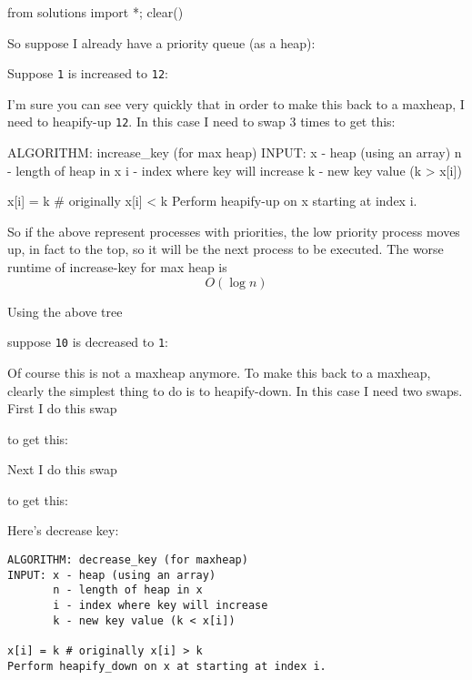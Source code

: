 \begin{python0}
from solutions import *; clear()
\end{python0}

So suppose I already have a priority queue (as a heap):




Suppose \texttt{1} is increased to \texttt{12}:




I'm sure you can see very quickly that in order to make this back to
a maxheap, I need to heapify-up \texttt{12}.
In this case I need to swap 3 times to get this:



\begin{console}
ALGORITHM: increase_key (for max heap)
INPUT: x - heap (using an array)
       n - length of heap in x
       i - index where key will increase
       k - new key value (k > x[i])

x[i] = k # originally x[i] < k
Perform heapify-up on x starting at index i.
\end{console}
So if the above represent processes with priorities, the low priority
process moves up, in fact to the top, so it will be the next process to
be executed.
The worse runtime of increase-key for max heap is
\[
O(\log n)
\]

Using the above tree



suppose \texttt{10} is decreased to \texttt{1}:



Of course this is not a maxheap anymore.
To make this back to a maxheap, clearly the simplest thing to do is
to heapify-down.
In this case I need two swaps.
First I do this swap



to get this:



Next I do this swap 



to get this:



Here's decrease key:

\begin{Verbatim}[frame=single]
ALGORITHM: decrease_key (for maxheap)
INPUT: x - heap (using an array)
       n - length of heap in x
       i - index where key will increase
       k - new key value (k < x[i])

x[i] = k # originally x[i] > k
Perform heapify_down on x at starting at index i.
\end{Verbatim}

